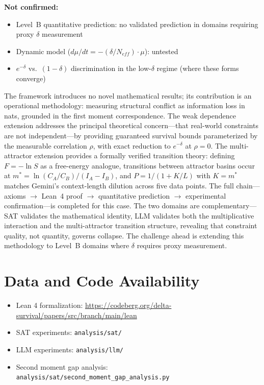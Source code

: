 \documentclass[11pt,a4paper]{article}
\begin{document}
\textbf{Not confirmed:}
\begin{itemize}
    \item Level~B quantitative prediction: no validated prediction in domains requiring proxy $\delta$ measurement
    \item Dynamic model ($d\mu/dt = -(\delta/N_{eff}) \cdot \mu$): untested
    \item $e^{-\delta}$ vs.\ $(1-\delta)$ discrimination in the low-$\delta$ regime (where these forms converge)
\end{itemize}

The framework introduces no novel mathematical results; its contribution is an operational methodology: measuring structural conflict as information loss in nats, grounded in the first moment correspondence. The weak dependence extension addresses the principal theoretical concern---that real-world constraints are not independent---by providing guaranteed survival bounds parameterized by the measurable correlation $\rho$, with exact reduction to $e^{-\delta}$ at $\rho = 0$. The multi-attractor extension provides a formally verified transition theory: defining $F = -\ln S$ as a free-energy analogue, transitions between attractor basins occur at $m^* = \ln(C_A/C_B)/(I_A - I_B)$, and $P = 1/(1 + K/L)$ with $K = m^*$ matches Gemini's context-length dilution across five data points. The full chain---axioms $\to$ Lean~4 proof $\to$ quantitative prediction $\to$ experimental confirmation---is completed for this case. The two domains are complementary---SAT validates the mathematical identity, LLM validates both the multiplicative interaction and the multi-attractor transition structure, revealing that constraint quality, not quantity, governs collapse. The challenge ahead is extending this methodology to Level~B domains where $\delta$ requires proxy measurement.

\section*{Data and Code Availability}

\begin{itemize}
    \item Lean 4 formalization: \url{https://codeberg.org/delta-survival/papers/src/branch/main/lean}
    \item SAT experiments: \texttt{analysis/sat/}
    \item LLM experiments: \texttt{analysis/llm/}
    \item Second moment gap analysis: \texttt{analysis/sat/second\_moment\_gap\_analysis.py}
\end{itemize}
\end{document}

